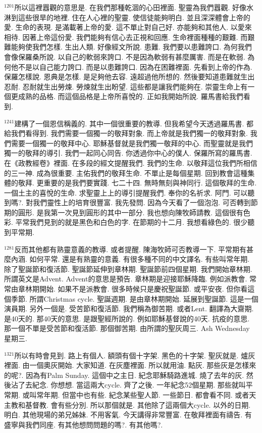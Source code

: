 \documentclass{book}
\begin{document}
$^{1201}$所以這裡囂觀的意思是.
在我們那種乾涸的心田裡面.
聖靈為我們囂觀.
好像水淋到這些很旱的地裡.
住在人心裡的聖靈.
使信徒能夠明白.
並且深深體會上帝的愛.
生命的表現.
是滿載著上帝的愛.
這不單止對自己好.
亦能夠和其他人.
以愛來相待.
因著上帝這份愛.
我們能夠有信心去正視和回應.
生命裡面種種的艱難.
而艱難能夠使我們怎樣.
生出人類.
好像經文所說.
患難.
我們要以患難誇口.
為何我們會像保羅桑所說.
以自己的軟弱來誇口.
不是因為軟弱有甚麼厲害.
而是在軟弱.
為何他不是以自己能力誇口.
而是以患難誇口.
因為在困難裡面.
先看到上帝的作為.
保羅怎樣說.
恩典是怎樣.
是足夠他去容.
遠超過他所想的.
然後要知道患難就生出忍耐.
忍耐就生出勞煉.
勞煉就生出盼望.
這些都是讓我們能夠在.
崇靈生命上有一個更成熟的品格.
而這個品格是上帝所喜悅的.
正如我開始所說.
羅馬書給我們看到.

$^{1241}$建構了一個恩信稱義的.
其中一個很重要的教導.
但我希望今天透過羅馬書.
都給我們看得到.
我們需要一個獨一的敬拜對象.
而上帝就是我們獨一的敬拜對象.
我們需要一個獨一的敬拜中心.
耶穌基督就是我們獨一敬拜的中心.
而聖靈就是我們獨一的敬拜的導引.
我們一起同心同告.
你透過你中心的僕人.
保羅所寫的羅馬書.
在《政教經卷》裡面.
在多段的經文提醒我們.
我們的生命.
以敬拜這位我們所相信的三一神.
成為很重要.
主佑我們的敬拜生命.
不單止是每個星期.
回到教會這種集體的敬拜.
更重要的是我們要實踐.
七二十四.
無時無刻與神同行.
這個敬拜的生命.
一個土主的喜悅的生命.
求聖靈上上的導引提醒我們.
奉你的名祈求.
阿門.
可以聽到嗎?.
對我們靈性上的培育很豐富.
我先發問.
因為今天看了一個泡泡.
可否轉到節期的圓形.
是我第一次見到圓形的其中一部分.
我也想向陳牧師請教.
這個很有色彩.
平常我們見到的就是黑色和白色的字.
在節期的十二月.
我想看綠色的.
很少聽到平常期.

$^{1281}$反而其他都有熟靈意義的教導.
或者提醒.
陳海牧師可否教導一下.
平常期有甚麼內涵.
如何平常.
還是有熟靈的意義.
有很多種不同的中文譯名.
有些叫常年期.
除了聖誕節和復活節.
聖誕節延伸到章林期.
聖誕節前四個星期.
我們開始章林期.
所謂英文是Advent.
Advent的意思是預告.
章林期是迎接耶穌降臨.
例如派教會.
常常由章林期開始.
如果不是派教會.
很多時候只是慶祝聖誕節.
或平安夜.
但你看這個季節.
所謂Christmas cycle.
聖誕週期.
是由章林期開始.
延展到聖誕節.
這是一個演員期.
另外一個是.
受苦節和復活節.
我們稱為御苦期.
或者Lent.
翻譯為大齋期.
是40天的.
那40天的意思.
是跟聖經所說的.
例如耶穌基督說的40天.
抗疫的意思.
那一個不單是受苦節和復活節.
那個御苦期.
由所謂的聖灰周三.
Ash Wednesday 星期三.

$^{1321}$所以有時會見到.
路上有個人.
額頭有個十字架.
黑色的十字架.
聖灰就是.
爐灰裡面.
由一個奧灰開始.
大家知道.
在灰塵裡面.
所以就用油.
點灰.
那些灰是怎樣來的呢?.
因為有Palm Sunday.
這個中之主日.
紀念耶穌騎路進城.
燒了去年的灰.
然後沾了去紀念.
你想想.
當這兩大cycle.
齊了之後.
一年紀念52個星期.
那些就叫平常期.
或叫常年期.
但當中也有些.
紀念某些聖人節.
一些節日.
都會看不同.
或者天主教和基督教.
會有些分別.
所以那個就是.
其他除了這兩個大cycle.
以外的日期.
明白.
其他現場的弟兄姊妹.
不用客氣.
今天講得非常豐富.
在敬拜裡面有禱告.
有盛寧與我們同座.
有其他想問問題的嗎?.
有其他嗎?.
\end{document}
